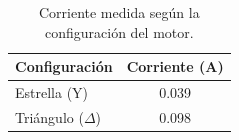 \begin{table}[H]
    \centering
    \caption{Corriente medida según la configuración del motor.}

    \begin{tabular}{lc}
        \toprule
        \textbf{Configuración} & \textbf{Corriente (A)} \\
        \midrule
        Estrella (Y)  & 0.039 \\
        Triángulo ($\Delta$) & 0.098 \\
        \bottomrule
    \end{tabular}\label{tab:mediciones}
\end{table}

